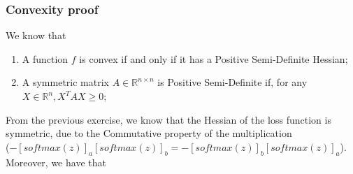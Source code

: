 \documentclass[10pt]{article}
\newcommand{\softmax}[1]{ [softmax(z)]_{#1} }
\begin{document}
\subsubsection{Convexity proof}

We know that
\begin{enumerate}
    \item A function $f$ is convex if and only if it has a Positive Semi-Definite Hessian;
    \item A symmetric matrix $A \in \mathbb{R}^{n \times n}$ is Positive Semi-Definite if, for any $X \in \mathbb{R}^{n}, X^{T}AX \geq 0$;
\end{enumerate}

From the previous exercise, we know that the Hessian of the loss function is symmetric, due to the Commutative property of the multiplication \\($-\softmax{a}\softmax{b} = -\softmax{b}\softmax{a}$).
Moreover, we have that
\end{document}
